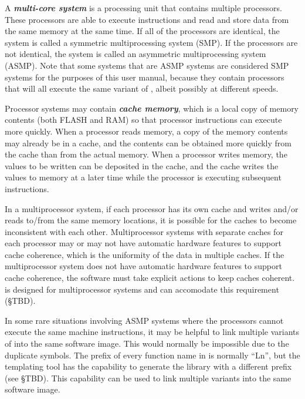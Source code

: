 A \emph{\textbf{multi-core system}}
is a processing unit that contains multiple processors.
These processors are able to execute instructions and read and store data
from the same memory at the same time.  If all of the processors are
identical, the system is called a symmetric multiprocessing system
(SMP).  If the processors are not identical, the system is called an
asymmetric multiprocessing system (ASMP).  
Note that some systems that are
ASMP systems are considered SMP systems for the purposes of this user
manual, because they contain processors that will all execute the same
variant of \emph{\productbasenameshort{}},
albeit possibly at different speeds.

Processor systems may contain \emph{\textbf{cache memory}},
which is a local copy of memory contents (both FLASH and RAM) so that
processor instructions can execute more quickly.  When a processor reads
memory, a copy of the memory contents may already be in a cache, and
the contents can be obtained more quickly from the cache than from
the actual memory.  When a processor writes memory, the values to
be written can be deposited in the cache, and the cache writes
the values to memory at a later time while the processor is
executing subsequent instructions.

In a multiprocessor system, if each processor has its own cache
and writes and/or reads to/from the same memory locations, it is possible
for the caches to become inconsistent with each other.
Multiprocessor systems with separate caches for each
processor may or may not have automatic hardware features to
support cache coherence, which is the uniformity of the data
in multiple caches.  If the multiprocessor system does not
have automatic hardware features to support cache coherence,
the software must take explicit actions to keep caches coherent.
\emph{\productbasenameshort{}} is designed for multiprocessor systems
and can accomodate this requirement (\S{}TBD).

In some rare situations involving ASMP systems where the processors
cannot execute the same machine instructions, it may be helpful to
link multiple variants of \emph{\productbasenameshort{}} into the
same software image.  This would normally be impossible due to the
duplicate symbols.  The prefix of every function name in
\emph{\productbasenameshort{}} is normally ``Ln'', but the templating tool
has the capability to generate the library with a different prefix (see
\S{}TBD).  This capability can be used to link multiple
\emph{\productbasenameshort{}} variants into the same software image.


